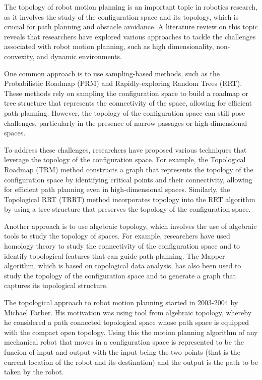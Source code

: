 The topology of robot motion planning is an important topic in robotics research, as it involves the study of the configuration space and its topology, which is crucial for path planning and obstacle avoidance. A literature review on this topic reveals that researchers have explored various approaches to tackle the challenges associated with robot motion planning, such as high dimensionality, non-convexity, and dynamic environments.

One common approach is to use sampling-based methods, such as the Probabilistic Roadmap (PRM) and Rapidly-exploring Random Trees (RRT). These methods rely on sampling the configuration space to build a roadmap or tree structure that represents the connectivity of the space, allowing for efficient path planning. However, the topology of the configuration space can still pose challenges, particularly in the presence of narrow passages or high-dimensional spaces.

To address these challenges, researchers have proposed various techniques that leverage the topology of the configuration space. For example, the Topological Roadmap (TRM) method constructs a graph that represents the topology of the configuration space by identifying critical points and their connectivity, allowing for efficient path planning even in high-dimensional spaces. Similarly, the Topological RRT (TRRT) method incorporates topology into the RRT algorithm by using a tree structure that preserves the topology of the configuration space.

Another approach is to use algebraic topology, which involves the use of algebraic tools to study the topology of spaces. For example, researchers have used homology theory to study the connectivity of the configuration space and to identify topological features that can guide path planning. The Mapper algorithm, which is based on topological data analysis, has also been used to study the topology of the configuration space and to generate a graph that captures its topological structure.


The topological approach to robot motion planning started in 2003-2004 by Michael Farber. His motivation was using tool from algebraic topology, whereby he considered a path connected topological space whose path space is equipped with the compact open topology. Using this the motion planning algorithm of any mechanical robot that moves in a configuration space is represented to be the funcion of input and output with the input being the two points (that is the current location of the robot and its destination) and the output is the path to be taken by the robot.


